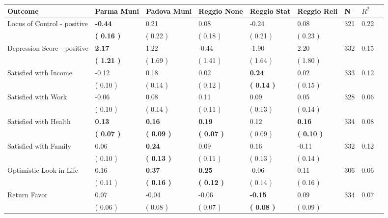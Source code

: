 \begin{tabular}{L{6.2cm} C{1.8cm} C{1.8cm} C{1.8cm} C{1.8cm} C{1.8cm} C{1.8cm} C{0.3cm} C{0.3cm}}
\toprule
 \textbf{Outcome} & \textbf{Parma Muni} & \textbf{Padova Muni} & \textbf{Reggio None} & \textbf{Reggio Stat} & \textbf{Reggio Reli} & \textbf{N} & \textbf{$ R^2$} \\
\midrule
Locus of Control - positive & \textbf{    -0.44} &      0.21 &      0.08 &     -0.24 &      0.08  & 321 &       0.22 \\ 
 & \textbf{(     0.16 )} & (     0.22 ) & (     0.18 ) & (     0.21 ) & (     0.23 )  & \\
Depression Score - positive & \textbf{     2.17} &      1.22 &     -0.44 &     -1.90 &      2.20  & 332 &       0.15 \\ 
 & \textbf{(     1.21 )} & (     1.69 ) & (     1.41 ) & (     1.64 ) & (     1.80 )  & \\
Satisfied with Income &     -0.12 &      0.18 &      0.02 & \textbf{     0.24} &      0.02  & 333 &       0.12 \\ 
 & (     0.10 ) & (     0.14 ) & (     0.12 ) & \textbf{(     0.14 )} & (     0.15 )  & \\
Satisfied with Work &     -0.06 &      0.08 &      0.11 &      0.09 &      0.05  & 328 &       0.06 \\ 
 & (     0.10 ) & (     0.14 ) & (     0.11 ) & (     0.13 ) & (     0.14 )  & \\
Satisfied with Health & \textbf{     0.13} & \textbf{     0.16} & \textbf{     0.19} &      0.12 & \textbf{     0.16}  & 334 &       0.08 \\ 
 & \textbf{(     0.07 )} & \textbf{(     0.09 )} & \textbf{(     0.07 )} & (     0.09 ) & \textbf{(     0.10 )}  & \\
Satisfied with Family &      0.06 & \textbf{     0.24} &      0.09 &      0.16 &     -0.11  & 332 &       0.12 \\ 
 & (     0.10 ) & \textbf{(     0.13 )} & (     0.11 ) & (     0.13 ) & (     0.14 )  & \\
Optimistic Look in Life &      0.16 & \textbf{     0.37} & \textbf{     0.25} &     -0.06 &      0.11  & 306 &       0.06 \\ 
 & (     0.11 ) & \textbf{(     0.16 )} & \textbf{(     0.12 )} & (     0.14 ) & (     0.16 )  & \\
Return Favor &      0.07 &     -0.04 &     -0.06 & \textbf{    -0.15} &      0.09  & 334 &       0.07 \\ 
 & (     0.06 ) & (     0.08 ) & (     0.07 ) & \textbf{(     0.08 )} & (     0.09 )  & \\

\end{tabular}

